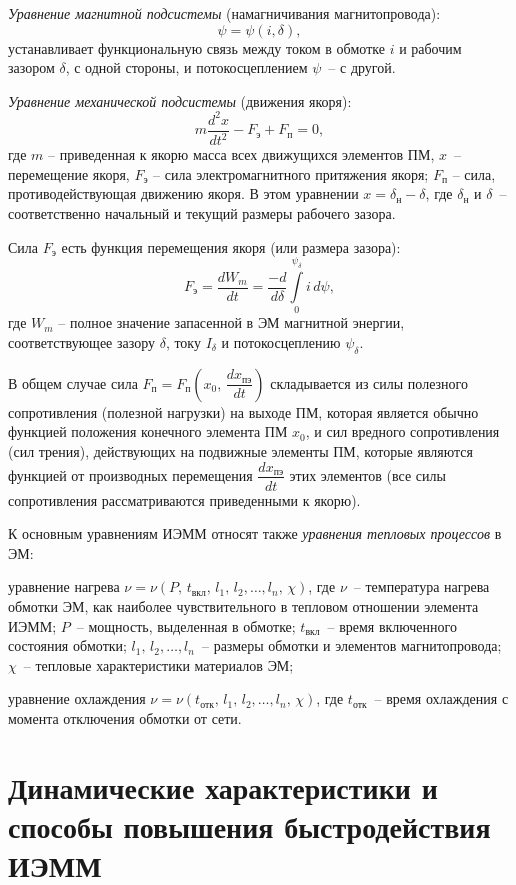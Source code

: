 \textit{Уравнение магнитной подсистемы} (намагничивания магнитопровода):
\[\psi = \psi(i,\delta), \]
устанавливает функциональную связь между током в обмотке $ i $ и рабочим зазором $ \delta $, с одной стороны, и потокосцеплением $ \psi $~-- с другой.

\textit{Уравнение механической подсистемы} (движения якоря):
\[ m\dfrac{d^2 x}{dt^2} - F_\text{э} + F_\text{п}=0, \]
где $ m $ -- приведенная к якорю масса всех движущихся элементов ПМ, $ x $~-- перемещение якоря, $ F_\text{э} $ -- сила электромагнитного притяжения якоря; $ F_\text{п} $ -- сила, противодействующая движению якоря. В этом уравнении $ x = \delta_\text{н} - \delta $, где $ \delta_\text{н} $ и $ \delta $~-- соответственно начальный и текущий размеры рабочего зазора.

Сила $ F_\text{э} $ есть функция перемещения якоря (или размера зазора):
\[ F_\text{э} = \dfrac{dW_m}{dt} = \dfrac{-d}{d\delta}\int\limits_{0}^{\psi_\delta}i\,d\psi,   \]
где $ W_m $ -- полное значение запасенной в ЭМ магнитной энергии, соответствующее зазору $ \delta $, току $ I_\delta $ и потокосцеплению $ \psi_\delta $.

В общем случае сила $ F_\text{п}  = F_\text{п} (x_0,\,\dfrac{dx_\text{пэ}}{dt} ) $ складывается из силы полезного сопротивления (полезной нагрузки) на выходе ПМ, которая является обычно функцией положения конечного элемента ПМ $ x_0 $, и сил вредного сопротивления (сил трения), действующих на подвижные элементы ПМ, которые являются функцией от производных перемещения $ \dfrac{dx_\text{пэ}}{dt} $ этих элементов (все силы сопротивления рассматриваются приведенными к якорю).

К основным уравнениям ИЭММ относят также\textit{ уравнения тепловых процессов} в ЭМ:

уравнение нагрева  $ \nu = \nu (P,\,t_\text{вкл},\,l_1,\,l_2,\ldots,l_n,\,\chi) $, где $ \nu $~-- температура нагрева обмотки ЭМ, как наиболее чувствительного в тепловом отношении элемента ИЭММ; $ P $~-- мощность, выделенная в обмотке; $ t_\text{вкл} $~-- время включенного состояния обмотки; $ l_1,\,l_2,\ldots,l_n $~-- размеры обмотки и элементов магнитопровода; $ \chi $~-- тепловые характеристики материалов ЭМ;

уравнение охлаждения $ \nu = \nu (t_\text{отк},\,l_1,\,l_2,\ldots,l_n,\,\chi ) $, где $ t_\text{отк} $~-- время охлаждения с момента отключения обмотки от сети.

\section{Динамические характеристики и способы повышения быстродействия ИЭММ}


